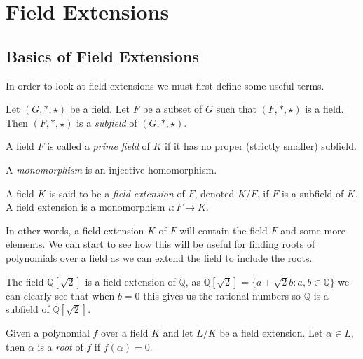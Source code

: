\section{Field Extensions}

\subsection{Basics of Field Extensions}
In order to look at field extensions we must first define some useful terms.
\begin{definition}
Let \((G, *,\star )\) be a field. Let \(F\) be a subset of \(G\) such that \((F,*,\star)\) is a field. Then \((F, *,\star)\) is a \textit{subfield}
 of \((G, *, \star)\).
\end{definition}
\begin{definition}
A field \(F\) is called a \textit{prime field} of \(K\) if it has no proper (strictly smaller) subfield.
\end{definition}
\begin{definition}
    A \textit{monomorphism} is an injective homomorphism.
\end{definition}

\begin{definition}
A field \(K\) is said to be a \textit{field extension} of \(F\), denoted \(K / F\), if \(F\) is a subfield of \(K\). \cite{Moy} A field extension is a monomorphism \(\iota: F \to K\).
\end{definition}
In other words, a field extension \(K\) of \(F\) will contain the field \(F\) and some more elements. We can start to see how this will be useful for finding roots of polynomials over a field as we can extend the field to include the roots.

\begin{example}
The field \(\mathbb{Q}[\sqrt{2}]\) is a field extension of \(\mathbb{Q}\), as \(\mathbb{Q}[\sqrt{2}] = \{a + \sqrt{2}b : a,b \in \mathbb{Q}\}\) we can clearly see that when \(b = 0\) this gives us the rational numbers so \(\mathbb{Q}\) is a subfield of \(\mathbb{Q}[\sqrt{2}]\).
\end{example}

\begin{definition}
	Given a polynomial $f$ over a field $K$ and let $L/K$ be a field extension. Let $\alpha \in L$, then $\alpha$ is a \textit{root} of $f$ if $f(\alpha)  = 0$.  
\end{definition}

